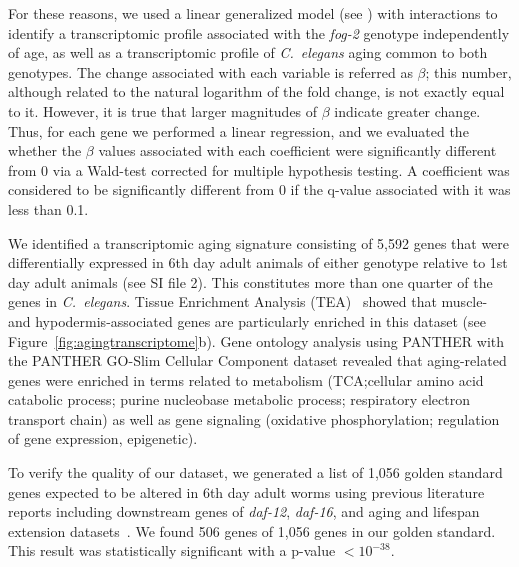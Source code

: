 \documentclass[10pt,letterpaper,twocolumn]{article}
\newcommand{\cel}{\emph{C.~elegans}}
\newcommand{\fog}{\emph{\mbox{fog-2}}}
\newcommand{\agen}{5,592}
\newcommand{\goldn}{1,056}
\newcommand{\goldfound}{506}
\newcommand{\goldpval}{$<10^{-38}$}
\begin{document}
For these reasons, we used a linear generalized model (see ) with interactions to identify a transcriptomic profile associated with the \fog{} genotype independently of age, as well as a transcriptomic profile of \cel{} aging common to both genotypes. The change associated with each variable is referred as $\beta$; this number, although related to the natural logarithm of the fold change, is not exactly equal to it. However, it is true that larger magnitudes of $\beta$ indicate greater change. Thus, for each gene we performed a linear regression, and we evaluated the whether the $\beta$ values associated with each coefficient were significantly different from 0 via a Wald-test corrected for multiple hypothesis testing. A coefficient was considered to be significantly different from 0 if the q-value associated with it was less than 0.1.

We identified a transcriptomic aging signature consisting of \agen{} genes that were differentially expressed in 6th day adult animals of either genotype relative to 1st day adult animals (see SI file 2). This constitutes more than one quarter of the genes in \cel{}. Tissue Enrichment Analysis (TEA)~\cite{Angeles-Albores2016} showed that muscle- and hypodermis-associated genes are particularly enriched in this dataset (see Figure~\ref{fig:agingtranscriptome}b). Gene ontology analysis using PANTHER with the PANTHER GO-Slim Cellular Component dataset revealed that aging-related genes were enriched in terms related to metabolism (TCA;\@ cellular amino acid catabolic process; purine nucleobase metabolic process; respiratory electron transport chain) as well as gene signaling (oxidative phosphorylation; regulation of gene expression, epigenetic).

To verify the quality of our dataset, we generated a list of \goldn{} golden standard genes expected to be altered in 6th day adult worms using previous literature reports including downstream genes of \emph{daf-12}, \emph{daf-16}, and aging and lifespan extension datasets~\cite{Murphy2003,Halaschek-wiener2005,Lund2002,McCormick2012,Eckley2013}. We found \goldfound{} genes of \goldn{} genes in our golden standard. This result was statistically significant with a p-value \goldpval{}.
\end{document}
